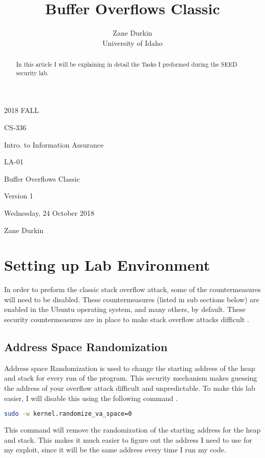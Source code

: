 \documentclass[14pt]{extarticle}
\begin{document}
\title{Buffer Overflows Classic}

\author{Zane Durkin\\
    University of Idaho}
\begin{description}[leftmargin=!, labelwidth=\widthof{\bfseries Author(s) Name(s)}]
\item [Year and Semester] 2018 FALL
\item [Course Number] CS-336
\item [Course Title] Intro. to Information Assurance
\item [Work Number] LA-01
\item [Work Name] Buffer Overflows Classic
\item [Work Version] Version 1
\item [Long Date] Wednesday, 24 October 2018
\item [Author(s) Name(s)] Zane Durkin
\end{description}
\begin{abstract}
In this article I will be explaining in detail the Tasks I preformed during the SEED security lab.
\end{abstract}

\section{Setting up Lab Environment}
In order to preform the classic stack overflow attack, some of the countermeasures will need to be disabled. These countermeasures (listed in sub sections below) are enabled in the Ubuntu operating system, and many others, by default. These security countermeasures are in place to make stack overflow attacks difficult \cite{seed-bof}.

\subsection{Address Space Randomization}
Address space Randomization is used to change the starting address of the heap and stack for every run of the program. This security mechanism makes guessing the address of your overflow attack difficult and unpredictable. To make this lab easier, I will disable this using the following command \cite{seed-bof}.
\begin{lstlisting}[language=bash]
	sudo -w kernel.randomize_va_space=0
\end{lstlisting}
This command will remove the randomization of the starting address for the heap and stack. This makes it much easier to figure out the address I need to use for my exploit, since it will be the same address every time I run my code.
\end{document}
